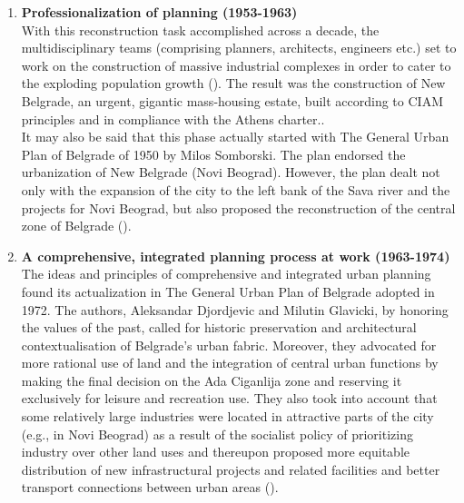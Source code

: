 \documentclass[11pt]{report}
\begin{document}
{{{{\begin{enumerate}
\item \textbf{Professionalization of planning (1953-1963)}
\\
With this reconstruction task accomplished across a decade, the multidisciplinary teams (comprising planners, architects, engineers etc.) set to work on the construction of massive industrial complexes in order to cater to the exploding population growth (\href{Hirt}{\citealt{hirt_belgrade_2009}}). The result was the construction of New Belgrade, an urgent, gigantic mass-housing estate, built according to CIAM principles and in compliance with the Athens charter..
\\
It may also be said that this phase actually started with The General Urban Plan of Belgrade of 1950 by Milos Somborski. The plan endorsed the urbanization of New Belgrade (Novi Beograd). However, the plan dealt not only with the expansion of the city to the left bank of the Sava river and the projects for Novi Beograd, but also proposed the reconstruction of the central zone of Belgrade (\href{Grozdanic}{\citealt{grozdanic_belgrade_2008}}).

\item \textbf{A comprehensive, integrated planning process at work (1963-1974)}
\\
The ideas and principles of comprehensive and integrated urban planning found its actualization in The General Urban Plan of Belgrade adopted in 1972. The authors, Aleksandar Djordjevic and Milutin Glavicki, by honoring the values of the past, called for historic preservation and architectural contextualisation of Belgrade’s urban fabric. Moreover, they advocated for more rational use of land and the integration of central urban functions by making the final decision on the Ada Ciganlija zone and reserving it exclusively for leisure and recreation use. They also took into account that some relatively large industries were located in attractive parts of the city (e.g., in Novi Beograd) as a result of the socialist policy of prioritizing industry over other land uses and thereupon proposed more equitable distribution of new infrastructural projects and related facilities and better transport connections between urban areas (\href{Hirt}{\citealt{hirt_belgrade_2009}}).


\end{enumerate}}}}}
\end{document}
